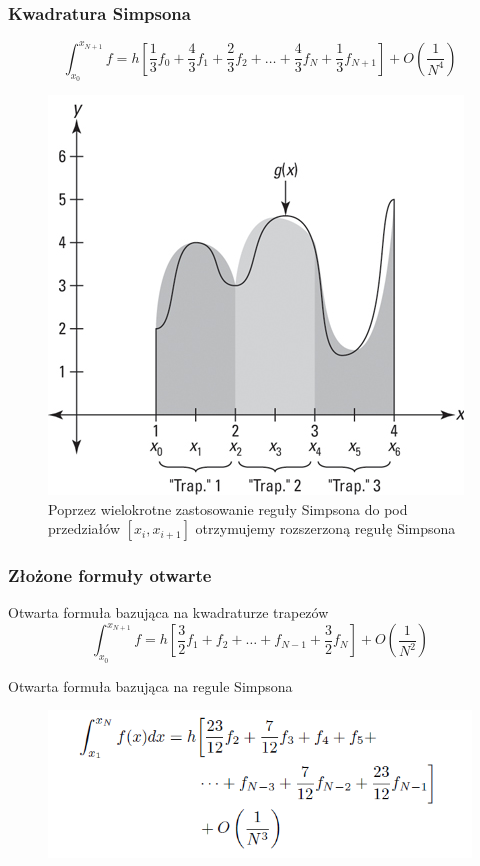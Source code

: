 \documentclass[compress,red]{beamer}
\begin{document}
	\begin{frame}
		\frametitle{Kwadratura Simpsona}
		
		\[
		\int_{x_0}^{x_{N+1}} f = h \left[ \frac{1}{3}f_0 + \frac{4}{3}f_1 + \frac{2}{3}f_2 +  \ldots +\frac{4}{3}f_N + \frac{1}{3}f_{N+1} \right]
		 + O(\frac{1}{N^4})\]

		 \begin{figure}
		 	\includegraphics[scale=0.3]{./img/q_sim2}
		 	\caption{Poprzez wielokrotne zastosowanie reguły Simpsona do 
		pod przedziałów $[x_i, x_{i+1}]$ otrzymujemy rozszerzoną regułę Simpsona}
		 \end{figure}
	\end{frame}	
	
	\begin{frame}
		\frametitle{Złożone formuły otwarte}
		
		Otwarta formuła bazująca na kwadraturze trapezów
		\[
		\int_{x_0}^{x_{N+1}} f = h \left[ \frac{3}{2}f_1 + f_2 +  \ldots + f_{N-1} + \frac{3}{2}f_{N} \right]
		 + O(\frac{1}{N^2})\]

		Otwarta formuła bazująca na regule Simpsona
		\begin{figure}
			\includegraphics[scale=0.5]{./img/ex_sim}
		\end{figure}
	\end{frame}	
	
\end{document}
